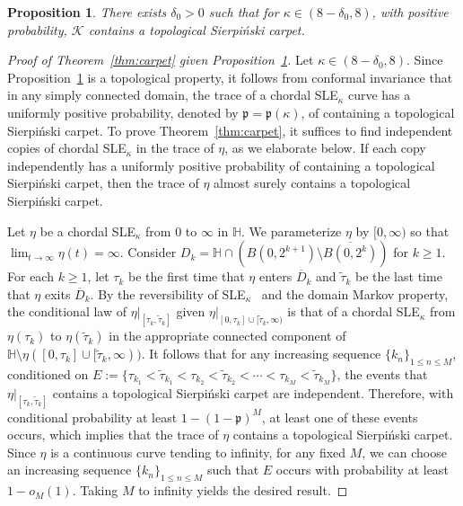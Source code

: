 \documentclass[a4paper]{article}
\numberwithin{equation}{section}
\newtheorem{proposition}[theorem]{Proposition}
\numberwithin{equation}{section}
\renewcommand{\1}{\mathbf{1}}
\begin{document}
\begin{proposition}\label{prop:carpet}
    There exists $\delta_0 > 0$ such that for $\kappa \in (8 - \delta_0,8)$, with positive probability, $\mathcal{K}$ contains a topological Sierpi\'nski carpet.
\end{proposition}

\begin{proof}[Proof of Theorem~\ref{thm:carpet} given Proposition~\ref{prop:carpet}]
    Let $\kappa \in (8-\delta_0, 8)$. Since Proposition~\ref{prop:carpet} is a topological property, it follows from conformal invariance that in any simply connected domain, the trace of a chordal SLE$_\kappa$ curve has a uniformly positive probability, denoted by $\mathfrak p = \mathfrak p(\kappa)$, of containing a topological Sierpi\'nski carpet. To prove Theorem~\ref{thm:carpet}, it suffices to find independent copies of chordal SLE$_\kappa$ in the trace of $\eta$, as we elaborate below. If each copy independently has a uniformly positive probability of containing a topological Sierpi\'nski carpet, then the trace of $\eta$ almost surely contains a topological Sierpi\'nski carpet.

    Let $\eta$ be a chordal SLE$_\kappa$ from $0$ to $\infty$ in $\mathbb{H}$. We parameterize $\eta$ by $[0,\infty)$ so that $\lim_{t \to \infty} \eta(t) = \infty$. Consider $D_k = \mathbb{H} \cap(B(0, 2^{k+1}) \setminus \overline{B(0, 2^k)})$ for $k \geq 1$. For each $k \geq 1$, let $\tau_k$ be the first time that $\eta$ enters $\overline{D}_k$ and $\widetilde{\tau}_k$ be the last time that $\eta$ exits $\overline{D}_k$. 
    By the reversibility of SLE$_\kappa$~\cite{IG3} and the domain Markov property, the conditional law of $\eta|_{[\tau_k, \widetilde{\tau}_k]}$ given $\eta|_{[0, \tau_k] \cup [\widetilde{\tau}_k, \infty)}$ is that of a chordal SLE$_\kappa$ from $\eta(\tau_k)$ to $\eta(\widetilde{\tau}_k)$ in the appropriate connected component of $\mathbb{H} \setminus \eta([0, \tau_k] \cup [\widetilde{\tau}_k, \infty))$. It follows that for any increasing sequence $\{k_n \}_{1 \leq n \leq M}$, conditioned on $E:= \{ \tau_{k_1} < \widetilde{\tau}_{k_1} < \tau_{k_2} < \widetilde{\tau}_{k_2} < \cdots < \tau_{k_M} < \widetilde \tau_{k_M}\}$, the events that $\eta|_{[\tau_k, \widetilde{\tau}_k]}$ contains a topological Sierpi\'nski carpet are independent. Therefore, with conditional probability at least $1 - (1 - \mathfrak p)^M$, at least one of these events occurs, which implies that the trace of $\eta$ contains a topological Sierpi\'nski carpet. Since $\eta$ is a continuous curve tending to infinity, for any fixed $M$, we can choose an increasing sequence $\{k_n\}_{1 \leq n \leq M}$ such that $E$ occurs with probability at least $1 - o_M(1)$. Taking $M$ to infinity yields the desired result.
\end{proof}
\end{document}
